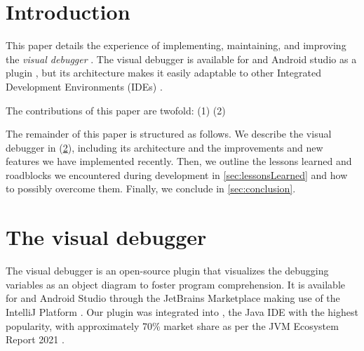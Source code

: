 \documentclass[sigconf]{acmart}
\begin{document}

\maketitle

\section{Introduction}
This paper details the experience of implementing, maintaining, and improving the \textit{visual debugger} \cite{krauterVisualDebuggerTool2022}.
The visual debugger is available for \intellij{} and Android studio as a plugin \cite{timkrauterVisualDebuggerIntelliJ2023}, but its architecture makes it easily adaptable to other Integrated Development Environments (IDEs) \cite{krauterVisualDebuggerTool2022}.

The contributions of this paper are twofold:
(1) %
(2) %


The remainder of this paper is structured as follows.
We describe the visual debugger in (\cref{sec:visualDebugger}), including its architecture and the improvements and new features we have implemented recently.
Then, we outline the lessons learned and roadblocks we encountered during development in \cref{sec:lessonsLearned} and how to possibly overcome them.
Finally, we conclude in \cref{sec:conclusion}.


\section{The visual debugger} \label{sec:visualDebugger}
The visual debugger is an open-source \intellij{} plugin that visualizes the debugging variables as an object diagram to foster program comprehension.
It is available for \intellij{} and Android Studio through the JetBrains Marketplace \cite{timkrauterVisualDebuggerIntelliJ2023, timkrauterVisualDebuggerTool2023} making use of the IntelliJ Platform \cite{kurbatovaIntelliJPlatformFramework2021}.
Our plugin was integrated into \intellij{}, the Java IDE with the highest popularity, with approximately 70\% market share as per the JVM Ecosystem Report 2021 \cite{brianvermeerJVMEcosystemReport2021}.
\end{document}
